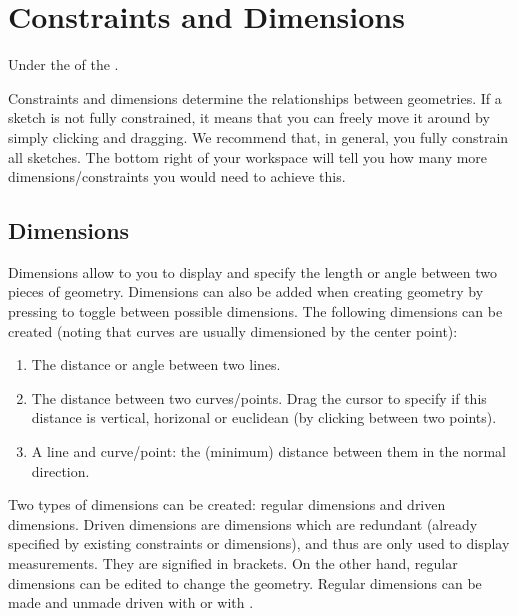 \section{Constraints and Dimensions}

\easydifficulty

\begin{where-to-find}
    Under the  of the .
    \end{where-to-find}
    

Constraints and dimensions determine the relationships between geometries. If a sketch is not fully constrained, it means that you can freely move it around by simply clicking and dragging. We recommend that, in general, you fully constrain all sketches. The bottom right of your workspace will tell you how many more dimensions/constraints you would need to achieve this.


\subsection{Dimensions}
Dimensions allow to you to display and specify the length or angle between two pieces of geometry. Dimensions can also be added when creating geometry by pressing  to toggle between possible dimensions. The following dimensions can be created (noting that curves are usually dimensioned by the center point):

\begin{enumerate}
\item The distance or angle between two lines.
\item The distance between two curves/points. Drag the cursor to specify if this distance is vertical, horizonal or euclidean (by clicking between two points).
\item A line and curve/point: the (minimum) distance between them in the normal direction.
\end{enumerate}

Two types of dimensions can be created: regular dimensions and driven dimensions. Driven dimensions are dimensions which are redundant (already specified by existing constraints or dimensions), and thus are only used to display measurements. They are signified in brackets. On the other hand, regular dimensions can be edited to change the geometry. Regular dimensions can be made and unmade driven with  or with .

